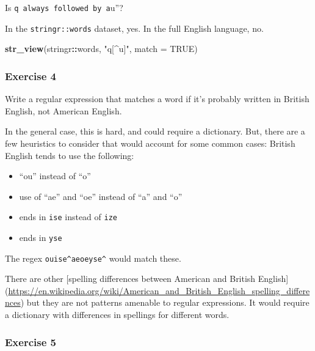 \documentclass[]{book}
\newenvironment{Shaded}{\begin{snugshade}}{\end{snugshade}}
\newcommand{\DataTypeTok}[1]{\textcolor[rgb]{0.13,0.29,0.53}{#1}}
\newcommand{\KeywordTok}[1]{\textcolor[rgb]{0.13,0.29,0.53}{\textbf{#1}}}
\newcommand{\NormalTok}[1]{#1}
\newcommand{\OperatorTok}[1]{\textcolor[rgb]{0.81,0.36,0.00}{\textbf{#1}}}
\newcommand{\OtherTok}[1]{\textcolor[rgb]{0.56,0.35,0.01}{#1}}
\newcommand{\StringTok}[1]{\textcolor[rgb]{0.31,0.60,0.02}{#1}}
\providecommand{\tightlist}{%
  \setlength{\itemsep}{0pt}\setlength{\parskip}{0pt}}
\theoremstyle{definition}
\theoremstyle{definition}
\theoremstyle{definition}
\theoremstyle{remark}
\begin{document}
Is
\texttt{q\textquotesingle{}\textquotesingle{}\ always\ followed\ by\ a}u''?

In the \texttt{stringr::words} dataset, yes. In the full English
language, no.

\begin{Shaded}
\begin{Highlighting}[]
\KeywordTok{str_view}\NormalTok{(stringr}\OperatorTok{::}\NormalTok{words, }\StringTok{"q[^u]"}\NormalTok{, }\DataTypeTok{match =} \OtherTok{TRUE}\NormalTok{)}
\end{Highlighting}
\end{Shaded}

\hypertarget{exercise-4-19}{%
\subsubsection{Exercise 4}\label{exercise-4-19}}

Write a regular expression that matches a word if it's probably written
in British English, not American English.

In the general case, this is hard, and could require a dictionary. But,
there are a few heuristics to consider that would account for some
common cases: British English tends to use the following:

\begin{itemize}
\tightlist
\item
  ``ou'' instead of ``o''
\item
  use of ``ae'' and ``oe'' instead of ``a'' and ``o''
\item
  ends in \texttt{ise} instead of \texttt{ize}
\item
  ends in \texttt{yse}
\end{itemize}

The regex
\texttt{ou\textbar{}ise\^{}\textbar{}ae\textbar{}oe\textbar{}yse\^{}}
would match these.

There are other {[}spelling differences between American and British
English{]}
(\url{https://en.wikipedia.org/wiki/American_and_British_English_spelling_differences})
but they are not patterns amenable to regular expressions. It would
require a dictionary with differences in spellings for different words.

\hypertarget{exercise-5-10}{%
\subsubsection{Exercise 5}\label{exercise-5-10}}
\end{document}
